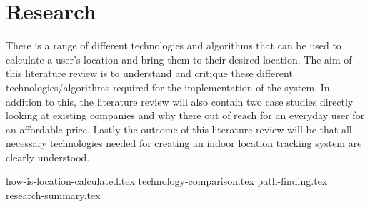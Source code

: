 \section{Research}
There is a range of different technologies and algorithms that can be used to calculate a user’s location and bring them to their desired location. The aim of this literature review is to understand and critique these different technologies/algorithms required for the implementation of the system. In addition to this, the literature review will also contain two case studies directly looking at existing companies and why there out of reach for an everyday user for an affordable price. Lastly the outcome of this literature review will be that all necessary technologies needed for creating an indoor location tracking system are clearly understood. 
		
{how-is-location-calculated.tex}
{technology-comparison.tex}
{path-finding.tex}
{research-summary.tex}
		